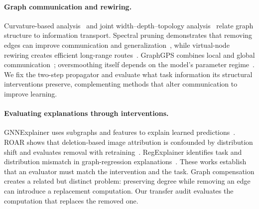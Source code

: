 \paragraph{Graph communication and rewiring.}
Curvature-based analysis~\cite{curvature2022} and joint width--depth--topology
analysis~\cite{oversquashing2023} relate graph structure to information
transport. Spectral pruning demonstrates that removing edges can improve
communication and generalization~\cite{pruning2024}, while virtual-node
rewiring creates efficient long-range routes~\cite{virtual2024}.
GraphGPS combines local and global communication~\cite{graphgps2022};
oversmoothing itself depends on the model's parameter
regime~\cite{phase2024}. We fix the two-step propagator and evaluate what task information its
structural interventions preserve, complementing methods that alter
communication to improve learning.

\paragraph{Evaluating explanations through interventions.}
GNNExplainer uses subgraphs and features to explain learned
predictions~\cite{gnnexplainer2019}. ROAR shows that deletion-based image
attribution is confounded by distribution shift and evaluates removal with
retraining~\cite{roar2019}. RegExplainer identifies task and distribution
mismatch in graph-regression explanations~\cite{regexplainer2024}.
These works establish that an evaluator must match the intervention and the
task. Graph compensation creates a related but distinct problem: preserving
degree while removing an edge can introduce a replacement computation.
Our transfer audit evaluates the computation that replaces the removed one.
